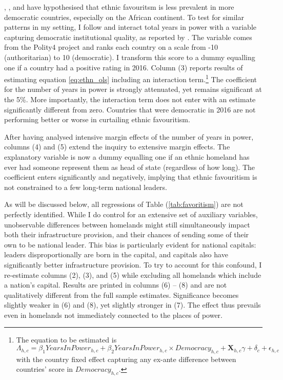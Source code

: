 \documentclass[11pt, oneside]{article}   	%
\let\oldref\ref
\renewcommand{\ref}[1]{(\oldref{#1})}
\begin{document}
\cite{DeLuca_Ethnicfavoritismaxiom_2018}, \cite{Hodler_RegionalFavoritism_2014}, and \cite{burgess_value_2015} have hypothesised that ethnic favouritsm is less prevalent in more democratic countries, especially on the African continent. To test for similar patterns in my setting, I follow \citeauthor{DeLuca_Ethnicfavoritismaxiom_2018} and interact total years in power with a variable capturing democratic institutional quality, as reported by \cite{Marshall_PolityProjectCenter_2015}. The variable comes from the Polity4 project and ranks each country on a scale from -10 (authoritarian) to 10 (democratic). I transform this score to a dummy equalling one if a country had a positive rating in 2016. Column (3) reports results of estimating equation \eqref{eq:ethn_ols} including an interaction term.\footnote{The equation to be estimated is \begin{equation*}
  \Lambda_{h,c} = \beta_{1} YearsInPower_{h,c} + \beta_{2} YearsInPower_{h,c}\times Democracy_{h,c} + \textbf{X}_{h,c}\gamma + \delta_{c} + \epsilon_{h,c}
\end{equation*} with the country fixed effect capturing any ex-ante difference between countries' score in $Democracy_{h,c}$.} The coefficient for the number of years in power is strongly attenuated, yet remains significant at the 5\%. More importantly, the interaction term does not enter with an estimate significantly different from zero. Countries that were democratic in 2016 are not performing better or worse in curtailing ethnic favouritism.

After having analysed intensive margin effects of the number of years in power, columns (4) and (5) extend the inquiry to extensive margin effects. The explanatory variable is now a dummy equalling one if an ethnic homeland has ever had someone represent them as head of state (regardless of how long). The coefficient enters significantly and negatively, implying that ethnic favouritism is not constrained to a few long-term national leaders.

As will be discussed below, all regressions of Table \ref{tab:favoritism} are not perfectly identified. While I do control for an extensive set of auxiliary variables, unobservable differences between homelands might still simultaneously impact both their infrastructure provision, and their chances of sending some of their own to be national leader. This bias is particularly evident for national capitals: leaders disproportionally are born in the capital, and capitals also have significantly better infrastructure provision. To try to account for this confound, I re-estimate columns (2), (3), and (5) while excluding all homelands which include a nation's capital. Results are printed in columns (6) -- (8) and are not qualitatively different from the full sample estimates. Significance becomes slightly weaker in (6) and (8), yet slightly stronger in (7). The effect thus prevails even in homelands not immediately connected to the places of power.
\end{document}

